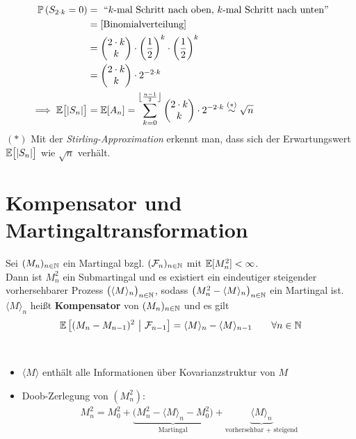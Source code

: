 \begin{beisp}
\begin{align*}
		\mathbb{P}\left(S_{2\cdot k}=0\right)&=\text{ ``$k$-mal Schritt nach oben, $k$-mal Schritt nach unten''}\\
		&=[\text{Binomialverteilung]}\\
		&=\begin{pmatrix}
			2\cdot k\\ k
		\end{pmatrix}\cdot\left(\frac{1}{2}\right)^k\cdot\left(\frac{1}{2}\right)^k\\
		&=\begin{pmatrix}
			2\cdot k \\ k
		\end{pmatrix}\cdot 2^{-2\cdot k}\\
		\implies
		\mathbb{E}\big[|S_n|\big]&=\mathbb{E}[A_n]=\sum\limits_{k=0}^{\left\lfloor\frac{n-1}{2}\right\rfloor}\begin{pmatrix}
			2\cdot k\\ k
		\end{pmatrix}\cdot 2^{-2\cdot k}\stackrel{(\ast)}{\sim}\sqrt{n}
	\end{align*}
	$(\ast)$ Mit der \textit{Stirling-Approximation} erkennt man, dass sich der Erwartungswert $\mathbb{E}\big[|S_n|\big]$ wie $\sqrt{n}$ verhält.
\end{beisp}

\section{Kompensator und Martingaltransformation} %
\setcounter{satz}{3}
\begin{lemma}\label{lemma2.4}
	Sei $(M_n)_{n\in\mathbb{N}}$ ein Martingal bzgl. $(\mathcal{F}_n)_{n\in\mathbb{N}}$ mit $\mathbb{E}[M_n^2]<\infty$.\\
	Dann ist $M_n^2$ ein Submartingal und es existiert ein eindeutiger steigender vorhersehbarer Prozess $\big(\langle M\rangle_n\big)_{n\in\mathbb{N}}$, sodass $\big(M_n^2-\langle M\rangle_n\big)_{n\in\mathbb{N}}$ ein Martingal ist.
	$\langle M\rangle_n$ heißt \textbf{Kompensator} von $(M_n)_{n\in\mathbb{N}}$ und es gilt
	\begin{align}\label{eqLemma2.4}
		\mathbb{E}\left[(M_n-M_{n-1})^2~\big|~\mathcal{F}_{n-1}\right]=\langle M\rangle_n-\langle M\rangle_{n-1}\qquad\forall n\in\mathbb{N}
	\end{align}
\end{lemma}

\begin{bemerkung}\ %
	\begin{itemize}
		\item $\langle M\rangle$ enthält alle Informationen über Kovarianzstruktur von $M$
		\item Doob-Zerlegung von $(M_n^2)$:
		\begin{align*}
			M_n^2=M_0^2+\underbrace{\big(M_n^2-\langle M\rangle_n-M_0^2\big)}_{\text{Martingal}}+\underbrace{\langle M\rangle_n}_{\text{vorhersehbar + steigend}}
		\end{align*}
	\end{itemize}
\end{bemerkung}

